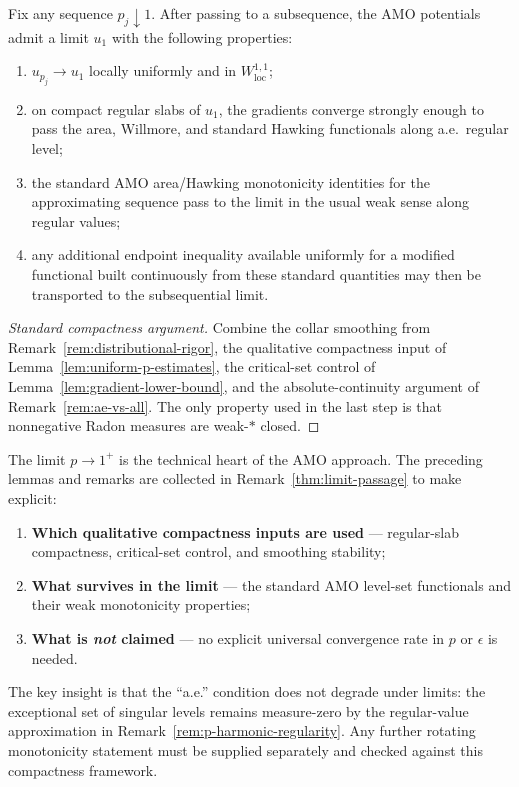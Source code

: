 \begin{remark}\label{thm:limit-passage}
Fix any sequence $p_j \downarrow 1$. After passing to a subsequence, the AMO potentials admit a limit $u_1$ with the following properties:
\begin{enumerate}
    \item $u_{p_j} \to u_1$ locally uniformly and in $W^{1,1}_{\mathrm{loc}}$;
    \item on compact regular slabs of $u_1$, the gradients converge strongly enough to pass the area, Willmore, and standard Hawking functionals along a.e.\ regular level;
    \item the standard AMO area/Hawking monotonicity identities for the approximating sequence pass to the limit in the usual weak sense along regular values;
    \item any additional endpoint inequality available uniformly for a modified functional built continuously from these standard quantities may then be transported to the subsequential limit.
\end{enumerate}
\end{remark}

\begin{proof}[Standard compactness argument]
Combine the collar smoothing from Remark~\ref{rem:distributional-rigor}, the qualitative compactness input of Lemma~\ref{lem:uniform-p-estimates}, the critical-set control of Lemma~\ref{lem:gradient-lower-bound}, and the absolute-continuity argument of Remark~\ref{rem:ae-vs-all}. The only property used in the last step is that nonnegative Radon measures are weak-$*$ closed.
\end{proof}

\begin{remark}\label{rem:consolidation}
The limit $p \to 1^+$ is the technical heart of the AMO approach. The preceding lemmas and remarks are collected in Remark~\ref{thm:limit-passage} to make explicit:
\begin{enumerate}
    \item \textbf{Which qualitative compactness inputs are used} --- regular-slab compactness, critical-set control, and smoothing stability;
    \item \textbf{What survives in the limit} --- the standard AMO level-set functionals and their weak monotonicity properties;
    \item \textbf{What is \emph{not} claimed} --- no explicit universal convergence rate in $p$ or $\epsilon$ is needed.
\end{enumerate}
The key insight is that the ``a.e.'' condition does not degrade under limits: the exceptional set of singular levels remains measure-zero by the regular-value approximation in Remark~\ref{rem:p-harmonic-regularity}. Any further rotating monotonicity statement must be supplied separately and checked against this compactness framework.
\end{remark}

